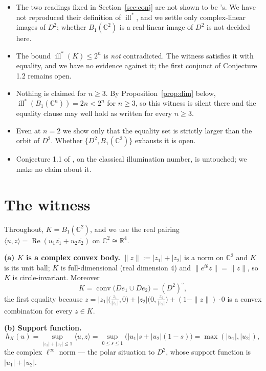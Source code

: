 \documentclass[11pt]{amsart}
\theoremstyle{remark}
\DeclareMathOperator{\ill}{ill}
\DeclareMathOperator{\conv}{conv}
\newcommand{\CC}{\mathbb{C}}
\newcommand{\RR}{\mathbb{R}}
\newcommand{\illstar}{\ill^{*}}
\begin{document}
\begin{itemize}
\item The two readings fixed in Section~\ref{sec:conj} are not shown to be
      \cite{RSS}'s. We have not reproduced their definition of $\illstar$, and we
      settle only complex-linear images of $D^{2}$; whether $B_{1}(\CC^{2})$ is a
      real-linear image of $D^{2}$ is not decided here.
\item The bound $\illstar(K)\le2^{n}$ is \emph{not} contradicted. The witness
      satisfies it with equality, and we have no evidence against it; the first
      conjunct of Conjecture 1.2 remains open.
\item Nothing is claimed for $n\ge3$. By Proposition~\ref{prop:dim} below,
      $\illstar(B_{1}(\CC^{n}))=2n<2^{n}$ for $n\ge3$, so this witness is silent
      there and the equality clause may well hold as written for every $n\ge3$.
\item Even at $n=2$ we show only that the equality set is strictly larger than
      the orbit of $D^{2}$. Whether $\{D^{2},B_{1}(\CC^{2})\}$ exhausts it is
      open.
\item Conjecture 1.1 of \cite{RSS}, on the classical illumination number, is
      untouched; we make no claim about it.
\end{itemize}

\section{The witness}\label{sec:witness}

Throughout, $K=B_{1}(\CC^{2})$, and we use the real pairing
$\langle u,z\rangle=\operatorname{Re}(u_{1}\overline{z_{1}}+u_{2}\overline{z_{2}})$
on $\CC^{2}\cong\RR^{4}$.

\smallskip
\noindent\textbf{(a) $K$ is a complex convex body.} $\|z\|:=|z_{1}|+|z_{2}|$ is
a norm on $\CC^{2}$ and $K$ is its unit ball; $K$ is full-dimensional (real
dimension $4$) and $\|e^{i\theta}z\|=\|z\|$, so $K$ is circle-invariant.
Moreover
\[
  K=\conv\bigl(De_{1}\cup De_{2}\bigr)=(D^{2})^{\circ},
\]
the first equality because $z=|z_{1}|\bigl(\tfrac{z_{1}}{|z_{1}|},0\bigr)
+|z_{2}|\bigl(0,\tfrac{z_{2}}{|z_{2}|}\bigr)+(1-\|z\|)\cdot 0$ is a convex
combination for every $z\in K$.

\smallskip
\noindent\textbf{(b) Support function.}
\[
  h_{K}(u)=\sup_{|z_{1}|+|z_{2}|\le1}\langle u,z\rangle
         =\sup_{0\le s\le1}\bigl(|u_{1}|s+|u_{2}|(1-s)\bigr)
         =\max(|u_{1}|,|u_{2}|),
\]
the complex $\ell^{\infty}$ norm --- the polar situation to $D^{2}$, whose
support function is $|u_{1}|+|u_{2}|$.
\end{document}
